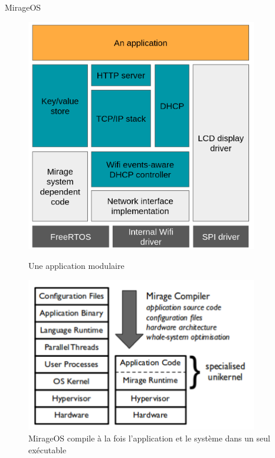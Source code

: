 
\begin{frame}{MirageOS}

\begin{figure}
    \centering
    \begin{minipage}{0.45\textwidth}
        \centering
        \includegraphics[width=0.9\textwidth]{slides/images/mirage.png}
        \caption{Une application modulaire}
    \end{minipage}\hfill
    \begin{minipage}{0.45\textwidth}
        \centering
        \includegraphics[width=0.9\textwidth]{slides/images/mirage2.png}
        \caption{MirageOS compile à la fois l'application et le système dans un seul exécutable}
    \end{minipage}
\end{figure}

\end{frame}

